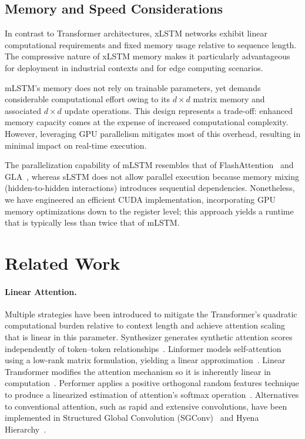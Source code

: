 \subsection{Memory and Speed Considerations}

In contrast to Transformer architectures, xLSTM networks exhibit linear computational requirements and fixed memory usage relative to sequence length. The compressive nature of xLSTM memory makes it particularly advantageous for deployment in industrial contexts and for edge computing scenarios.

mLSTM’s memory does not rely on trainable parameters, yet demands considerable computational effort owing to its $d \times d$ matrix memory and associated $d \times d$ update operations. This design represents a trade-off: enhanced memory capacity comes at the expense of increased computational complexity. However, leveraging GPU parallelism mitigates most of this overhead, resulting in minimal impact on real-time execution.

The parallelization capability of mLSTM resembles that of FlashAttention~\citep{Dao:22,Dao:23} and GLA~\citep{Yang:23arxiv}, whereas sLSTM does not allow parallel execution because memory mixing (hidden-to-hidden interactions) introduces sequential dependencies. Nonetheless, we have engineered an efficient CUDA implementation, incorporating GPU memory optimizations down to the register level; this approach yields a runtime that is typically less than twice that of mLSTM.

\section{Related Work}
\label{sec:related}

\paragraph{Linear Attention.} Multiple strategies have been introduced to mitigate the Transformer’s quadratic computational burden relative to context length and achieve attention scaling that is linear in this parameter. Synthesizer generates synthetic attention scores independently of token--token relationships~\citep{Tay:20arxiv}. Linformer models self-attention using a low-rank matrix formulation, yielding a linear approximation~\citep{Wang:20arxiv}. Linear Transformer modifies the attention mechanism so it is inherently linear in computation~\citep{Katharopoulos:20}. Performer applies a positive orthogonal random features technique to produce a linearized estimation of attention’s softmax operation~\citep{Choromanski:21}. Alternatives to conventional attention, such as rapid and extensive convolutions, have been implemented in Structured Global Convolution (SGConv)~\citep{Li:22} and Hyena Hierarchy~\citep{Poli:23}.

